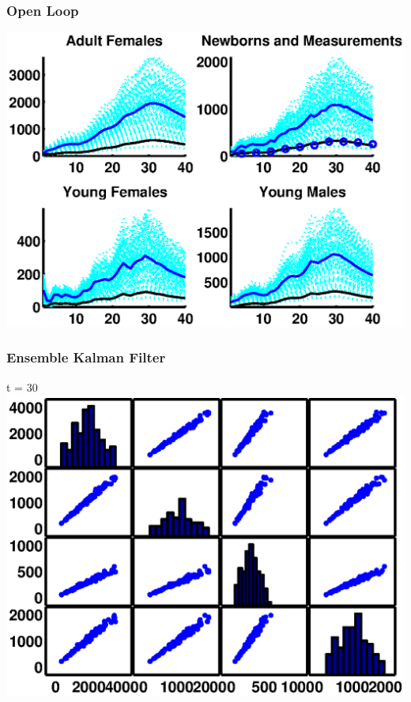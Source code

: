 \documentclass[mathserif]{beamer}
\begin{document}
\begin{frame}
  \frametitle{Open Loop}
  \begin{center}
    \includegraphics[width=1\textwidth]{openloop}
  \end{center}
\end{frame}

\begin{frame}
  \begin{center}
    \frametitle{Ensemble Kalman Filter}
    t = 30
    \includegraphics[width=1\textwidth]{ol30cov}
  \end{center}
\end{frame}
\end{document}
